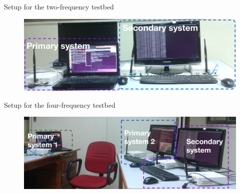 \documentclass{beamer}
\begin{document}
  \begin{frame}{Setup for the two-frequency testbed}
    \begin{figure}
      \centering
      \includegraphics[width=\linewidth]{img/freq2}
    \end{figure}
  \end{frame}
  
  \begin{frame}{Setup for the four-frequency testbed}
    \begin{figure}
      \centering
      \includegraphics[width=\linewidth]{img/freq4}
    \end{figure}
  \end{frame}

    
\end{document}
